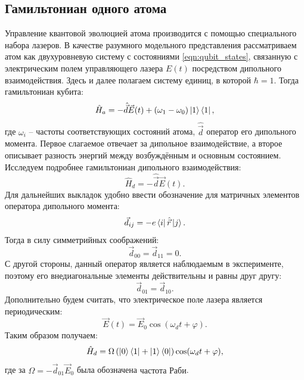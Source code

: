 \subsection{Гамильтониан одного атома}
Управление квантовой эволюцией атома производится с помощью специального набора лазеров. В качестве разумного модельного представления 
рассматриваем атом как двухуровневую систему с состояниями \ref{eqn:qubit_states}, связанную с электрическим полем управляющего лазера
$E(t)$ посредством дипольного взаимодействия. Здесь и далее полагаем систему единиц, в которой $\hbar = 1$. Тогда гамильтониан кубита:
\begin{equation}\label{eqn:atom_hamiltonian}
    \hat{H}_a = - \hat{\vec{d}} \vec{E}(t) + (\omega_{1} - \omega_0) \ket{1} \bra{1},
\end{equation}
где $\omega_i$ -- частоты соответствующих состояний атома, $\hat{\vec{d}}$ оператор его дипольного момента.
Первое слагаемое отвечает за дипольное взаимодействие, а второе описывает разность энергий между возбуждённым и основным состоянием.
Исследуем подробнее гамильтониан дипольного взаимодействия:
\begin{equation}
    \hat{H}_d = - \hat{\vec{d}} \vec{E}(t).
\end{equation}
Для дальнейших выкладок удобно ввести обозначение для матричных элементов оператора дипольного момента:
\begin{equation}
    \vec{d}_{ij} = -e\bra{i}\hat{\vec{r}}\ket{j}.
\end{equation}
Тогда в силу симметрийных соображений:
\begin{equation}
    \vec{d}_{00} = \vec{d}_{11} = 0.
\end{equation}
С другой стороны, данный оператор является наблюдаемым в эксперименте, поэтому его внедиагональные элементы действительны и равны друг другу:
\begin{equation}
    \vec{d}_{01} = \vec{d}_{10}.
\end{equation}
Дополнительно будем считать, что электрическое поле лазера является периодическим:
\begin{equation}
    \vec{E}(t) = \vec{E}_0 \cos (\omega_d t + \varphi).
\end{equation}
Таким образом получаем:
\begin{equation}
    \hat{H}_d = \Omega \left(\ket{0} \bra{1} + \ket{1} \bra{0} \right) \cos (\omega_d t + \varphi),
\end{equation}
где за $\Omega = -\vec{d}_{01} \vec{E}_0$ была обозначена $\textbf{частота Раби}$.

